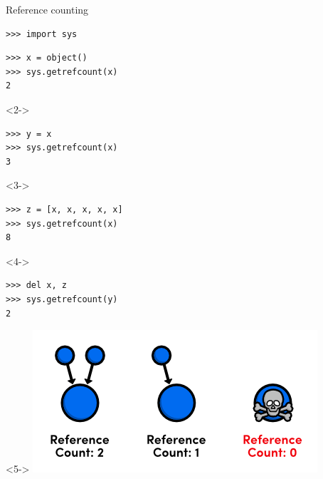 \documentclass[aspectratio=169]{beamer}
\begin{document}
\begin{frame}[fragile]{Reference counting}
\vspace{0.4 cm}
\small

\begin{verbatim}
>>> import sys
\end{verbatim}
\vspace{0.1 cm}
\small
\begin{verbatim}
>>> x = object()
>>> sys.getrefcount(x)
2
\end{verbatim}

\begin{uncoverenv}<2->
\vspace{0.1 cm}
\begin{verbatim}
>>> y = x
>>> sys.getrefcount(x)
3
\end{verbatim}
\end{uncoverenv}

\begin{uncoverenv}<3->
\vspace{0.1 cm}
\begin{verbatim}
>>> z = [x, x, x, x, x]
>>> sys.getrefcount(x)
8
\end{verbatim}
\end{uncoverenv}

\begin{uncoverenv}<4->
\vspace{0.1 cm}
\begin{verbatim}
>>> del x, z
>>> sys.getrefcount(y)
2
\end{verbatim}
\end{uncoverenv}

\begin{uncoverenv}<5->
\vspace{-5 cm}
\hfill \includegraphics[width=6 cm]{reference-counting.png} \hspace{0.75 cm}
\vspace{5 cm}
\end{uncoverenv}
\end{frame}
\end{document}
